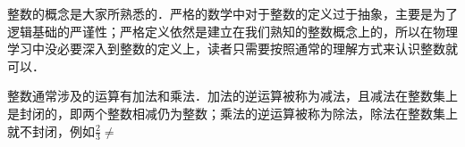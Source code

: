 
整数的概念是大家所熟悉的．严格的数学中对于整数的定义过于抽象，主要是为了逻辑基础的严谨性；严格定义依然是建立在我们熟知的整数概念上的，所以在物理学习中没必要深入到整数的定义上，读者只需要按照通常的理解方式来认识整数就可以．

整数通常涉及的运算有加法和乘法．加法的逆运算被称为减法，且减法在整数集上是封闭的，即两个整数相减仍为整数；乘法的逆运算被称为除法，除法在整数集上就不封闭，例如$\frac{2}{3}\not=$